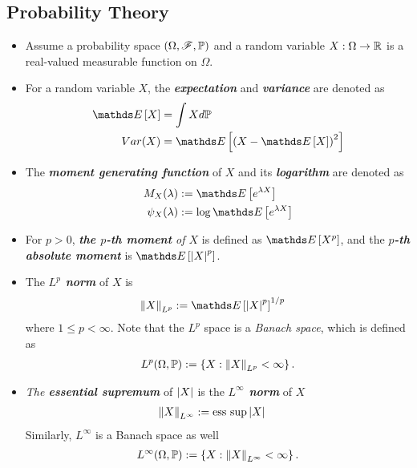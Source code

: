 \documentclass[11pt]{article}
\begin{document}
\subsection{Probability Theory}
\begin{itemize}
\item Assume a probability space $(\Omega, {\mathscr F}, {\mathbb P})$ and a random variable $X: \Omega \to {\mathbb R}$ is a real-valued measurable function on $\Omega$.

\item For a random variable $X$, the \emph{\textbf{expectation}} and \emph{\textbf{variance}} are denoted as
\begin{align*}
\E{}{X} &= \int X d\bP \\
Var(X) &= \E{}{\paren{X - \E{}{X}}^2}
\end{align*}

\item The \emph{\textbf{moment generating function}} of $X$ and its \emph{\textbf{logarithm}} are denoted as
\begin{align*}
M_{X}(\lambda) &:= \E{}{e^{\lambda X}} \\
\psi_{X}(\lambda) &:= \log   \E{}{e^{\lambda X}}
\end{align*}

\item For $p > 0$, \emph{\textbf{the $p$-th moment} of $X$} is defined as $\E{}{X^p}$, and the \emph{\textbf{$p$-th absolute moment}} is $\E{}{\abs{X}^p}$.

\item The \emph{\textbf{$L^p$ norm}} of $X$ is
\begin{align*}
\norm{X}{L^p} &:= \E{}{\abs{X}^p}^{1/p}
\end{align*} where $1 \le p  < \infty$. Note that the $L^p$ space is a \emph{Banach space}, which is defined as
\begin{align*}
L^{p}(\Omega, {\mathbb P}) := \left\{X: \left\|X\right\|_{L^p} < \infty \right\}.
\end{align*}

\item \emph{The \textbf{essential supremum}} of $\left\lvert X \right\rvert$ is the \emph{\textbf{$L^\infty$ norm}} of $X$
\begin{align*}
\left\|X\right\|_{L^\infty} &:= \text{ess sup}\left\lvert X \right\rvert
\end{align*} Similarly, $L^{\infty}$ is a Banach space as well
\begin{align*}
L^{\infty}(\Omega, {\mathbb P}) := \left\{X: \left\|X\right\|_{L^\infty} < \infty \right\}.
\end{align*}


\end{itemize}
\end{document}
